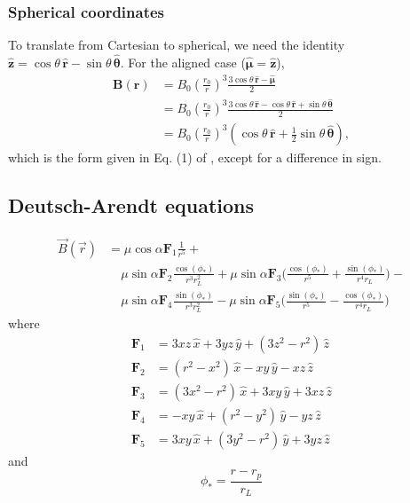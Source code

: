 \documentclass{book}
\newcommand{\F}[1]{\bm{F}_{#1}}
\newcommand{\ph}{\phi_\ast}
\newcommand{\unitvec}[1]{\hat{\bm{#1}}}
\begin{document}
\subsubsection{Spherical coordinates}

To translate from Cartesian to spherical, we need the identity $\unitvec{z} = \cos\theta \,\unitvec{r} - \sin\theta\,\unitvec{\theta}$.
For the aligned case ($\unitvec{\mu} = \unitvec{z}$),
\begin{equation}
\begin{aligned}
    \bm{B}(\bm{r})
        &= B_0\left(\frac{r_0}{r}\right)^3\frac{3\cos\theta\,\unitvec{r} - \unitvec{\mu}}{2} \\
        &= B_0\left(\frac{r_0}{r}\right)^3\frac{3\cos\theta\,\unitvec{r} - \cos\theta \,\unitvec{r} + \sin\theta\,\unitvec{\theta}}{2} \\
        &= B_0\left(\frac{r_0}{r}\right)^3\left(\cos\theta\,\unitvec{r} + \frac12 \sin\theta\,\unitvec{\theta}\right),
\end{aligned}
\end{equation}
which is the form given in Eq. (1) of \citet{Davis1947}, except for a difference in sign.

\subsection{Deutsch-Arendt equations}

\begin{equation}
\begin{aligned}
    \vec{B}(\vec{r}) &= \mu \cos{\alpha} \F{1} \frac{1}{r^5} + \\
                   &\hspace{13pt} \mu \sin{\alpha} \F{2} \frac{\cos(\ph)}{r^3 r_L^2} +
                                  \mu \sin{\alpha} \F{3} \bigg(\frac{\cos(\ph)}{r^5} + \frac{\sin(\ph)}{r^4 r_L}\bigg) - \\
                   &\hspace{13pt} \mu \sin{\alpha} \F{4} \frac{\sin(\ph)}{r^3 r_L^2} -
                                  \mu \sin{\alpha} \F{5} \bigg(\frac{\sin(\ph)}{r^5} - \frac{\cos(\ph)}{r^4 r_L}\bigg)
\end{aligned}
\end{equation}
where
\begin{equation}
\begin{aligned}
    \F{1} &= 3xz\,\hat{x} + 3yz\,\hat{y} + (3z^2-r^2)\,\hat{z} \\
    \F{2} &= (r^2-x^2)\,\hat{x} - xy\,\hat{y} - xz\,\hat{z} \\
    \F{3} &= (3x^2-r^2)\,\hat{x} + 3xy\,\hat{y} + 3xz\,\hat{z} \\
    \F{4} &= -xy\,\hat{x} + (r^2-y^2)\,\hat{y} - yz\,\hat{z} \\
    \F{5} &= 3xy\,\hat{x} + (3y^2-r^2)\,\hat{y} + 3yz\,\hat{z}
\end{aligned}
\end{equation}
and
\begin{equation}
    \ph = \frac{r - r_p}{r_L}
\end{equation}
\end{document}
